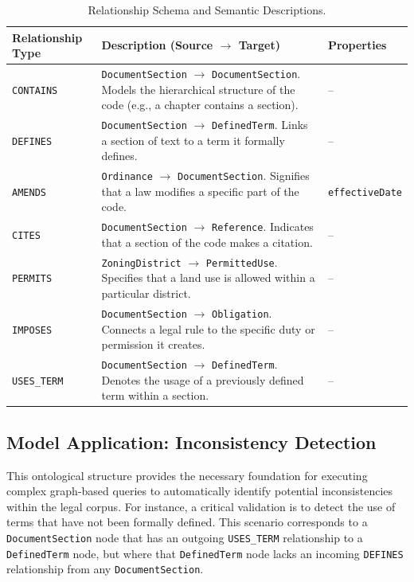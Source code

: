 \begin{table}[htbp]
\centering
{}
\caption{Relationship Schema and Semantic Descriptions.}
\label{tab:relationship_schema}
\begin{tabularx}{\textwidth}{@{} >{\raggedright}p{} >{\raggedright}X L{0.15\textwidth} @{}}
\toprule
\textbf{Relationship Type} & \textbf{Description (Source \(\rightarrow\) Target)} & \textbf{Properties} \\
\midrule
\texttt{CONTAINS} & \texttt{DocumentSection} \(\rightarrow\) \texttt{DocumentSection}. Models the hierarchical structure of the code (e.g., a chapter contains a section). & -- \\
\addlinespace
\texttt{DEFINES} & \texttt{DocumentSection} \(\rightarrow\) \texttt{DefinedTerm}. Links a section of text to a term it formally defines. & -- \\
\addlinespace
\texttt{AMENDS} & \texttt{Ordinance} \(\rightarrow\) \texttt{DocumentSection}. Signifies that a law modifies a specific part of the code. & \texttt{effectiveDate} \\
\addlinespace
\texttt{CITES} & \texttt{DocumentSection} \(\rightarrow\) \texttt{Reference}. Indicates that a section of the code makes a citation. & -- \\
\addlinespace
\texttt{PERMITS} & \texttt{ZoningDistrict} \(\rightarrow\) \texttt{PermittedUse}. Specifies that a land use is allowed within a particular district. & -- \\
\addlinespace
\texttt{IMPOSES} & \texttt{DocumentSection} \(\rightarrow\) \texttt{Obligation}. Connects a legal rule to the specific duty or permission it creates. & -- \\
\addlinespace
\texttt{USES\_TERM} & \texttt{DocumentSection} \(\rightarrow\) \texttt{DefinedTerm}. Denotes the usage of a previously defined term within a section. & -- \\
\bottomrule
\end{tabularx}
\end{table}

\subsection{Model Application: Inconsistency Detection}
This ontological structure provides the necessary foundation for executing complex graph-based queries to automatically identify potential inconsistencies within the legal corpus. For instance, a critical validation is to detect the use of terms that have not been formally defined. This scenario corresponds to a \texttt{DocumentSection} node that has an outgoing \texttt{USES\_TERM} relationship to a \texttt{DefinedTerm} node, but where that \texttt{DefinedTerm} node lacks an incoming \texttt{DEFINES} relationship from any \texttt{DocumentSection}.

